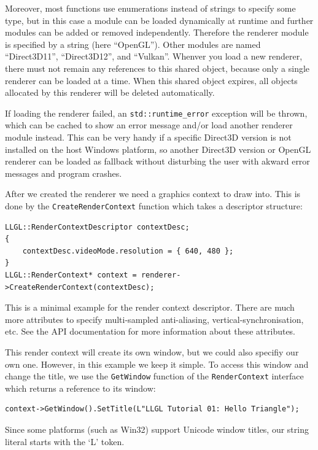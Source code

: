 \documentclass{article}
\begin{document}
Moreover, most functions use enumerations instead of strings to specify some type, but in this case
a module can be loaded dynamically at runtime and further modules can be added or removed independently.
Therefore the renderer module is specified by a string (here ``OpenGL''). Other modules are
named ``Direct3D11'', ``Direct3D12'', and ``Vulkan''.
Whenver you load a new renderer, there must not remain any references to this shared object,
because only a single renderer can be loaded at a time.
When this shared object expires, all objects allocated by this renderer will be deleted automatically.

If loading the renderer failed, an \texttt{std::runtime\_error} exception will be thrown,
which can be cached to show an error message and/or load another renderer module instead.
This can be very handy if a specific Direct3D version is not installed on the host Windows platform,
so another Direct3D version or OpenGL renderer can be loaded as fallback
without disturbing the user with akward error messages and program crashes.

After we created the renderer we need a graphics context to draw into.
This is done by the \texttt{CreateRenderContext} function which takes a descriptor structure:
\begin{lstlisting}
LLGL::RenderContextDescriptor contextDesc;
{
    contextDesc.videoMode.resolution = { 640, 480 };
}
LLGL::RenderContext* context = renderer->CreateRenderContext(contextDesc);
\end{lstlisting}
This is a minimal example for the render context descriptor. There are much more attributes
to specify multi-sampled anti-aliasing, vertical-synchronisation, etc.
See the API documentation for more information about these attributes.

This render context will create its own window, but we could also specifiy our own one.
However, in this example we keep it simple. To access this window and change the title,
we use the \texttt{GetWindow} function of the \texttt{RenderContext} interface
which returns a reference to its window:
\begin{lstlisting}
context->GetWindow().SetTitle(L"LLGL Tutorial 01: Hello Triangle");
\end{lstlisting}
Since some platforms (such as Win32) support Unicode window titles, our string literal starts with the `L' token.
\end{document}

